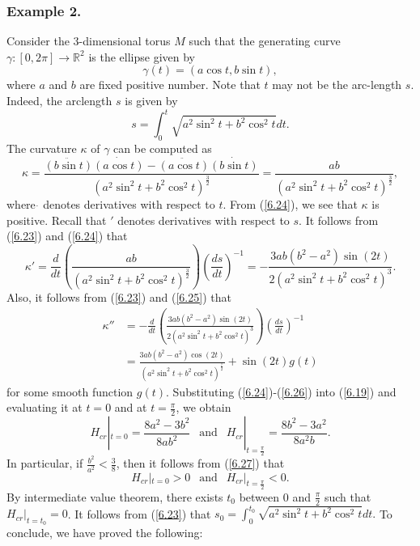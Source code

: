 \documentclass{amsart}
\theoremstyle{Corollary}
\numberwithin{equation}{section}
\begin{document}
\subsubsection{Example 2.} 
Consider the $3$-dimensional torus $M$ such that 
the generating curve  $\gamma: [0,2\pi]\to\mathbb{R}^2$
is the ellipse given by 
$$\gamma(t)=(a\cos t, b\sin t),$$
where $a$ and $b$ are fixed positive number. 
Note that $t$ may not be the arc-length $s$. Indeed, the arclength $s$ is given by 
\begin{equation}\label{6.23}
s=\int^t_0\sqrt{a^2\sin^2t+b^2\cos^2t}dt.
\end{equation}
The curvature $\kappa$ of $\gamma$ can be computed as
\begin{equation}\label{6.24}
\kappa=\frac{\ddot{(b\sin t)} \dot{(a\cos t)}-\ddot{(a\cos t)}\dot{(b\sin t)}}{(a^2\sin^2t+b^2\cos^2t)^{\frac{3}{2}}}
=\frac{ab}{(a^2\sin^2t+b^2\cos^2t)^{\frac{3}{2}}},
\end{equation}
where $\dot{}$ denotes derivatives with respect to $t$. 
From (\ref{6.24}), we see that $\kappa$ is positive. 
Recall that $'$ denotes derivatives with respect to $s$. 
It follows from (\ref{6.23}) and (\ref{6.24}) that 
\begin{equation}\label{6.25}
\kappa'=\frac{d}{dt}\left(\frac{ab}{(a^2\sin^2t+b^2\cos^2t)^{\frac{3}{2}}}\right)\left(\frac{ds}{dt}\right)^{-1}
=-\frac{3ab(b^2-a^2)\sin(2t)}{2(a^2\sin^2t+b^2\cos^2t)^{3}}.
\end{equation}
Also, it follows from (\ref{6.23}) and (\ref{6.25}) that 
\begin{equation}\label{6.26}
\begin{split}
  \kappa''&=-\frac{d}{dt}\left(\frac{3ab(b^2-a^2)\sin (2t)}{2(a^2\sin^2t+b^2\cos^2t)^{3}}\right)\left(\frac{ds}{dt}\right)^{-1}\\
  &=\frac{3ab(b^2-a^2)\cos (2t)}{(a^2\sin^2t+b^2\cos^2t)^{\frac{7}{2}}}+\sin(2t) g(t)
  \end{split}
\end{equation}
for some smooth function $g(t)$. 
Substituting (\ref{6.24})-(\ref{6.26}) into 
(\ref{6.19})
and evaluating it at $t=0$ and at $t=\frac{\pi}{2}$, we obtain 
\begin{equation}\label{6.27}
H_{cr}|_{t=0}=\frac{8a^2-3b^2}{8ab^2}~~\mbox{ and }~~
H_{cr}|_{t=\frac{\pi}{2}}=\frac{8b^2-3a^2}{8a^2b}.
\end{equation}
In particular, if 
$\frac{b^2}{a^2}<\frac{3}{8}$, then 
it follows from (\ref{6.27}) that 
\begin{equation}\label{6.28}
H_{cr}|_{t=0}>0~~\mbox{ and }~~
H_{cr}|_{t=\frac{\pi}{2}}<0.
\end{equation}
By intermediate value theorem, there exists $t_0$ between $0$ and $\frac{\pi}{2}$
such that 
$H_{cr}|_{t=t_0}=0$. It follows from (\ref{6.23}) that 
$s_0=\displaystyle\int^{t_0}_0\sqrt{a^2\sin^2t+b^2\cos^2t}dt.$
To conclude, we have proved the following: 
\end{document}
